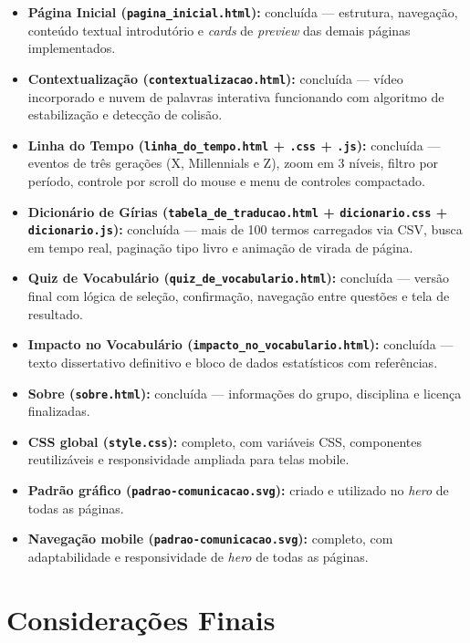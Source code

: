 \documentclass[12pt,a4paper]{article}
\begin{document}
\begin{itemize}[leftmargin=*]
    \item \textbf{Página Inicial (\texttt{pagina\_inicial.html}):} concluída — estrutura,
    navegação, conteúdo textual introdutório e \textit{cards} de \textit{preview} das demais
    páginas implementados.
    \item \textbf{Contextualização (\texttt{contextualizacao.html}):} concluída — vídeo
    incorporado e nuvem de palavras interativa funcionando com algoritmo de estabilização e
    detecção de colisão.
    \item \textbf{Linha do Tempo (\texttt{linha\_do\_tempo.html} + \texttt{.css} +
    \texttt{.js}):} concluída — eventos de três gerações (X, Millennials e Z), zoom em 3 níveis,
    filtro por período, controle por scroll do mouse e menu de controles compactado.
    \item \textbf{Dicionário de Gírias (\texttt{tabela\_de\_traducao.html} +
    \texttt{dicionario.css} + \texttt{dicionario.js}):} concluída — mais de 100 termos
    carregados via CSV, busca em tempo real, paginação tipo livro e animação de virada de
    página.
    \item \textbf{Quiz de Vocabulário (\texttt{quiz\_de\_vocabulario.html}):} concluída — versão
    final com lógica de seleção, confirmação, navegação entre questões e tela de resultado.
    \item \textbf{Impacto no Vocabulário (\texttt{impacto\_no\_vocabulario.html}):} concluída —
    texto dissertativo definitivo e bloco de dados estatísticos com referências.
    \item \textbf{Sobre (\texttt{sobre.html}):} concluída — informações do grupo, disciplina e
    licença finalizadas.
    \item \textbf{CSS global (\texttt{style.css}):} completo, com variáveis CSS, componentes
    reutilizáveis e responsividade ampliada para telas mobile.
    \item \textbf{Padrão gráfico (\texttt{padrao-comunicacao.svg}):} criado e utilizado no
    \textit{hero} de todas as páginas.
    \item \textbf{Navegação mobile (\texttt{padrao-comunicacao.svg}):} completo, com adaptabilidade e responsividade de
    \textit{hero} de todas as páginas.
\end{itemize}


\section{Considerações Finais}
\end{document}

